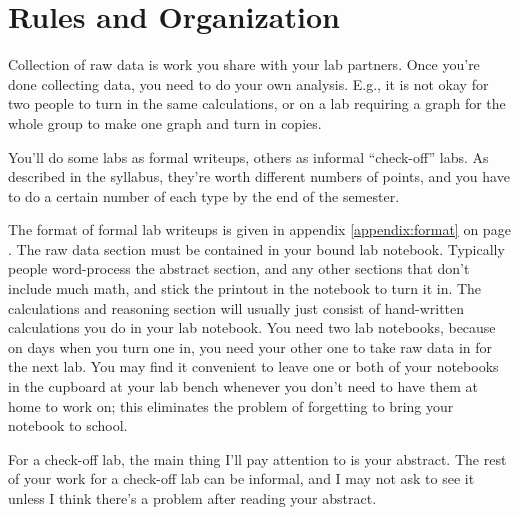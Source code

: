 \section*{Rules and Organization}

Collection of raw data is work you share with your lab partners.
Once you're done collecting data, you need to do your own analysis.
E.g., it is not okay for two people to turn in the same calculations,
or on a lab requiring a graph for the whole group to make one graph
and turn in copies.

You'll do some labs as formal writeups, others as informal ``check-off''
labs. As described in the syllabus, they're worth different numbers of
points, and you have to do a certain number of each type by the end of
the semester.

The format of formal lab writeups is given in appendix \ref{appendix:format}
on page \pageref{format-really-here}. The raw data section must be contained in your
bound lab notebook. Typically people word-process the abstract section, and any
other sections that don't include much math, and stick the printout in the notebook
to turn it in. The calculations and reasoning section will usually just consist
of hand-written calculations you do in your lab notebook. You need two lab notebooks,
because on days when you turn one in, you need your other one to take raw data in
for the next lab. You may find it convenient to leave one or both of your notebooks
in the cupboard at your lab bench whenever you don't need to have them at home to
work on; this eliminates the problem of forgetting to bring your notebook to school.

For a check-off lab, the main thing I'll pay attention to is your abstract. The rest
of your work for a check-off lab can be informal, and I may not ask to see it unless
I think there's a problem after reading your abstract.
